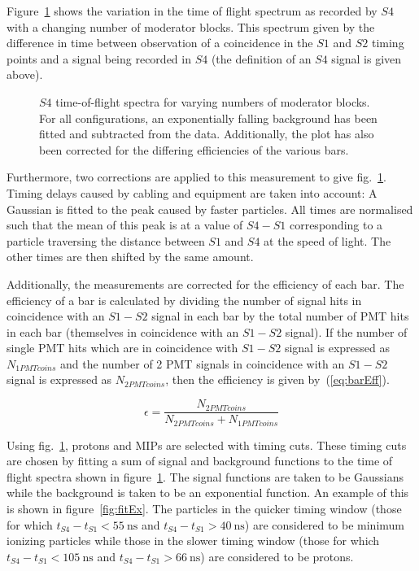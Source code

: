 	Figure~\ref{fig:s4tof} shows the variation in the time of flight spectrum as recorded by $S4$ with a changing number of moderator blocks. 
	This spectrum given by the difference in time between observation of a coincidence in the $S1$ and $S2$ timing points and a signal being recorded in $S4$ (the definition of an $S4$ signal is given above).
	
	\begin{figure}[h]
		\begin{adjustbox}{max totalsize={.8\textwidth}{.5\textheight},center}
			
		\end{adjustbox}
		\caption{$S4$ time-of-flight spectra for varying numbers of moderator blocks. For all configurations, an exponentially falling background has been fitted and subtracted from the data. Additionally, the plot has also been corrected for the differing efficiencies of the various bars.}
		\label{fig:s4tof}	
	\end{figure}

	Furthermore, two corrections are applied to this measurement to give fig.~\ref{fig:s4tof}. 
	Timing delays caused by cabling and equipment are taken into account:
	A Gaussian is fitted to the peak caused by faster particles.
	All times are normalised such that the mean of this peak is at a value of $S4 - S1$ corresponding to a particle traversing the distance between $S1$ and $S4$ at the speed of light. 
	The other times are then shifted by the same amount.
	
	Additionally, the measurements are corrected for the efficiency of each bar. 
	The efficiency of a bar is calculated by dividing the number of signal hits in coincidence with an $S1-S2$ signal in each bar by the total number of PMT hits in each bar (themselves in coincidence with an $S1-S2$ signal). 
	If the number of single PMT hits which are in coincidence with $S1-S2$ signal is expressed as $N_{1PMTcoins}$ and the number of 2 PMT signals in coincidence with an $S1-S2$ signal is expressed as $N_{2PMTcoins}$, then the efficiency is given by~(\ref{eq:barEff}).
	
	\begin{equation}
		\epsilon = \frac{N_{2PMTcoins}}{N_{2PMTcoins}+N_{1PMTcoins}}
		\label{eq:barEff}
	\end{equation}
	
	Using fig.~\ref{fig:s4tof}, protons and MIPs are selected with timing cuts. 
	These timing cuts are chosen by fitting a sum of signal and background functions to the time of flight spectra shown in figure~\ref{fig:s4tof}. 
	The signal functions are taken to be Gaussians while the background is taken to be an exponential function. 
	An example of this is shown in figure~\ref{fig:fitEx}.
	The particles in the quicker timing window (those for which $t_{S4}-t_{S1}<55~\text{ns}$ and $t_{S4}-t_{S1}>40~\text{ns}$) are considered to be minimum ionizing particles while those in the slower timing window (those for which $t_{S4}-t_{S1}<105~\text{ns}$ and $t_{S4}-t_{S1}>66~\text{ns}$) are considered to be protons.
	
